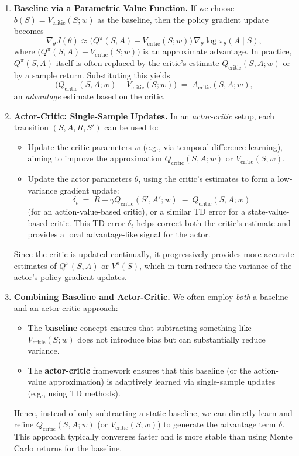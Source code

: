 \begin{enumerate}
    \item \textbf{Baseline via a Parametric Value Function.}
    If we choose \(b(S) = V_{\text{critic}}(S; w)\) as the baseline, then the policy gradient update becomes
    \[
      \nabla_{\theta} J(\theta) 
      \approx 
      \bigl(Q^\pi(S,A) - V_{\text{critic}}(S; w)\bigr)\,\nabla_{\theta}\log \pi_\theta(A \mid S),
    \]
    where \(\bigl(Q^\pi(S,A) - V_{\text{critic}}(S; w)\bigr)\) is an approximate advantage. In practice, \(Q^\pi(S,A)\) itself is often replaced by the critic’s estimate \(Q_{\text{critic}}(S,A; w)\) or by a sample return. Substituting this yields
    \[
      \bigl(Q_{\text{critic}}(S,A; w) - V_{\text{critic}}(S; w)\bigr) 
      \;=\; 
      A_{\text{critic}}(S,A; w),
    \]
    an \emph{advantage} estimate based on the critic.

    \item \textbf{Actor-Critic: Single-Sample Updates.}
    In an \emph{actor-critic} setup, each transition \((S, A, R, S')\) can be used to:
    \begin{itemize}
        \item Update the critic parameters \(w\) (e.g., via temporal-difference learning), aiming to improve the approximation \(Q_{\text{critic}}(S,A; w)\) or \(V_{\text{critic}}(S; w)\).
        \item Update the actor parameters \(\theta\), using the critic’s estimates to form a low-variance gradient update:
        \[
          \delta_t 
          \;=\; 
          R + \gamma Q_{\text{critic}}(S', A'; w) \;-\; Q_{\text{critic}}(S,A; w)
        \]
        (for an action-value-based critic), or a similar TD error for a state-value-based critic. This TD error \(\delta_t\) helps correct both the critic’s estimate and provides a local advantage-like signal for the actor.
    \end{itemize}
    Since the critic is updated continually, it progressively provides more accurate estimates of \(Q^\pi(S,A)\) or \(V^\pi(S)\), which in turn reduces the variance of the actor’s policy gradient updates.

    \item \textbf{Combining Baseline and Actor-Critic.}
    We often employ \emph{both} a baseline and an actor-critic approach:
    \begin{itemize}
        \item The \textbf{baseline} concept ensures that subtracting something like \(V_{\text{critic}}(S; w)\) does not introduce bias but can substantially reduce variance.
        \item The \textbf{actor-critic} framework ensures that this baseline (or the action-value approximation) is adaptively learned via single-sample updates (e.g., using TD methods).
    \end{itemize}
    Hence, instead of only subtracting a static baseline, we can directly learn and refine \(Q_{\text{critic}}(S,A; w)\) (or \(V_{\text{critic}}(S; w)\)) to generate the advantage term \(\delta\). This approach typically converges faster and is more stable than using Monte Carlo returns for the baseline.


\end{enumerate}
